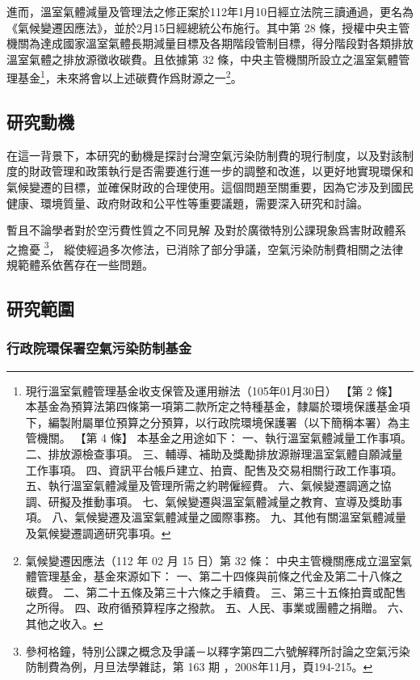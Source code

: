 \documentclass[12pt,a4paper]{article}
\begin{document}
進而，溫室氣體減量及管理法之修正案於112年1月10日經立法院三讀通過，更名為《氣候變遷因應法》，並於2月15日經總統公布施行。其中第 28 條，授權中央主管機關為達成國家溫室氣體長期減量目標及各期階段管制目標，得分階段對各類排放溫室氣體之排放源徵收碳費。且依據第 32 條，中央主管機關所設立之溫室氣體管理基金\footnote{現行溫室氣體管理基金收支保管及運用辦法（105年01月30日）
【第 2 條】
本基金為預算法第四條第一項第二款所定之特種基金，隸屬於環境保護基金項下，編製附屬單位預算之分預算，以行政院環境保護署（以下簡稱本署）為主管機關。
【第 4 條】
本基金之用途如下：
一、執行溫室氣體減量工作事項。
二、排放源檢查事項。
三、輔導、補助及獎勵排放源辦理溫室氣體自願減量工作事項。
四、資訊平台帳戶建立、拍賣、配售及交易相關行政工作事項。
五、執行溫室氣體減量及管理所需之約聘僱經費。
六、氣候變遷調適之協調、研擬及推動事項。
七、氣候變遷與溫室氣體減量之教育、宣導及獎助事項。
八、氣候變遷及溫室氣體減量之國際事務。
九、其他有關溫室氣體減量及氣候變遷調適研究事項。
}，未來將會以上述碳費作爲財源之一\footnote{氣候變遷因應法（112 年 02 月 15 日）第 32 條：
中央主管機關應成立溫室氣體管理基金，基金來源如下：
一、第二十四條與前條之代金及第二十八條之碳費。
二、第二十五條及第三十六條之手續費。
三、第三十五條拍賣或配售之所得。
四、政府循預算程序之撥款。
五、人民、事業或團體之捐贈。
六、其他之收入。}。


\subsection{研究動機}

在這一背景下，本研究的動機是探討台灣空氣污染防制費的現行制度，以及對該制度的財政管理和政策執行是否需要進行進一步的調整和改進，以更好地實現環保和氣候變遷的目標，並確保財政的合理使用。這個問題至關重要，因為它涉及到國民健康、環境質量、政府財政和公平性等重要議題，需要深入研究和討論。


暫且不論學者對於空污費性質之不同見解
及對於廣徵特別公課現象爲害財政體系之擔憂
\footnote{參柯格鐘，特別公課之概念及爭議－以釋字第四二六號解釋所討論之空氣污染防制費為例，月旦法學雜誌，第 163 期 ，2008年11月，頁194-215。}，
縱使經過多次修法，已消除了部分爭議，空氣污染防制費相關之法律規範體系依舊存在一些問題。

\subsection{研究範圍}



\subsubsection{行政院環保署空氣污染防制基金}
\end{document}
